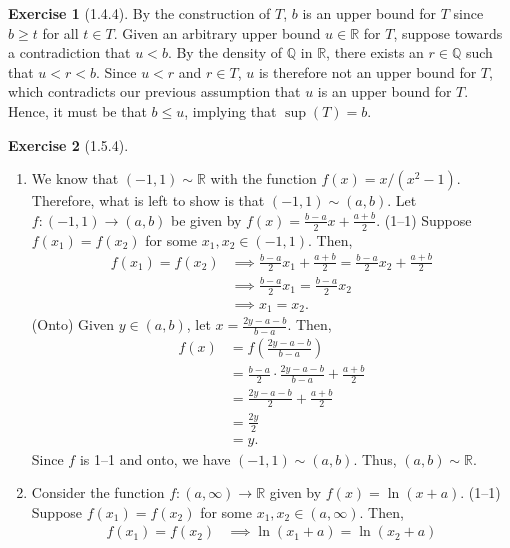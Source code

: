 \documentclass{amsart}
\theoremstyle{definition}
\newtheorem{exercise}{Exercise}
\newcommand{\Q}{\mathbb{Q}}
\newcommand{\R}{\mathbb{R}}
\begin{document}
\begin{exercise}[1.4.4]
  By the construction of $T$, $b$ is an upper bound for $T$ since $b \ge t$ for
  all $t \in T$. Given an arbitrary upper bound $u \in \R$ for $T$, suppose
  towards a contradiction that $u < b$. By the density of $\Q$ in $\R$, there
  exists an $r \in \Q$ such that $u < r < b$. Since $u < r$ and $r \in T$, $u$
  is therefore not an upper bound for $T$, which contradicts our previous
  assumption that $u$ is an upper bound for $T$. Hence, it must be that $b \le
  u$, implying that $\sup(T) = b$.
\end{exercise}

\begin{exercise}[1.5.4]
  \begin{enumerate}[label={(\alph*)}]
    \item We know that $(-1, 1) \sim \R$ with the function $f(x) = x / (x^2 -
      1)$. Therefore, what is left to show is that $(-1, 1) \sim (a, b)$. Let $f
      : (-1, 1) \rightarrow (a, b)$ be given by $f(x) = \frac{b - a}{2} x +
      \frac{a + b}{2}$. (1--1) Suppose $f(x_1) = f(x_2)$ for some $x_1, x_2
      \in (-1, 1)$. Then,
      \begin{align*}
        f(x_1) = f(x_2) &\implies \frac{b - a}{2} x_1 + \frac{a + b}{2} =
        \frac{b - a}{2} x_2 + \frac{a + b}{2} \\
        &\implies \frac{b - a}{2} x_1 = \frac{b - a}{2} x_2 \\
        &\implies x_1 = x_2.
      \end{align*}
      (Onto) Given $y \in (a, b)$, let $x = \frac{2y - a - b}{b - a}$. Then,
      \begin{align*}
        f(x) &= f\left(\frac{2y - a - b}{b - a}\right) \\
        &= \frac{b - a}{2} \cdot \frac{2y - a - b}{b - a} + \frac{a + b}{2} \\
        &= \frac{2y - a - b}{2} + \frac{a + b}{2} \\
        &= \frac{2y}{2} \\
        &= y.
      \end{align*}
      Since $f$ is 1--1 and onto, we have $(-1, 1) \sim (a, b)$. Thus, $(a, b)
      \sim \R$.
    \item Consider the function $f : (a, \infty) \rightarrow \R$ given by $f(x)
      = \ln(x + a)$. (1--1) Suppose $f(x_1) = f(x_2)$ for some $x_1, x_2 \in (a,
      \infty)$. Then,
      \begin{align*}
        f(x_1) = f(x_2) &\implies \ln(x_1 + a) = \ln(x_2 + a) \\

\end{align*}
\end{enumerate}
\end{exercise}
\end{document}
